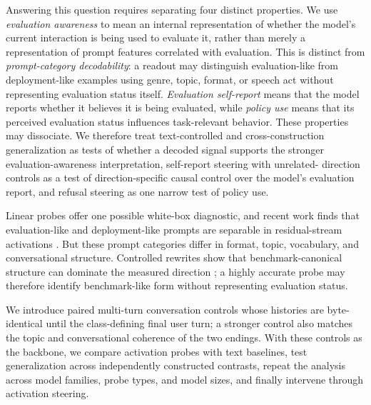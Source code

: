 \documentclass{article}
\begin{document}
Answering this question requires separating four distinct properties. We use
\emph{evaluation awareness} to mean an internal
representation of whether the model's current interaction is being used to
evaluate it, rather than merely a representation of prompt features correlated
with evaluation. This is distinct from \emph{prompt-category decodability}: a
readout may distinguish evaluation-like from deployment-like examples using
genre, topic, format, or speech act without representing evaluation status
itself. \emph{Evaluation self-report} means that the model reports whether it
believes it is being evaluated, while \emph{policy use} means that its perceived
evaluation status influences task-relevant behavior. These properties may
dissociate. We therefore treat text-controlled and cross-construction
generalization as tests of whether a decoded signal supports the stronger
evaluation-awareness interpretation, self-report steering with unrelated-
direction controls as a test of direction-specific causal control over the
model's evaluation report, and refusal steering as one narrow test of policy
use.

Linear probes offer one possible white-box diagnostic, and recent work finds
that evaluation-like and deployment-like prompts are separable in residual-stream
activations \citep{nguyen2025probing}. But these prompt categories differ in
format, topic, vocabulary, and conversational structure. Controlled
rewrites show that benchmark-canonical structure can dominate the measured
direction \citep{devbunova2026format}; a highly accurate probe may therefore
identify benchmark-like form without representing evaluation status.

We introduce paired multi-turn conversation controls whose histories are
byte-identical until the class-defining final user turn; a stronger control also matches the topic and
conversational coherence of the two endings. With these controls as the
backbone, we compare activation probes with text baselines, test generalization
across independently constructed contrasts, repeat the analysis across model
families, probe types, and model sizes, and finally intervene through activation
steering.
\end{document}
